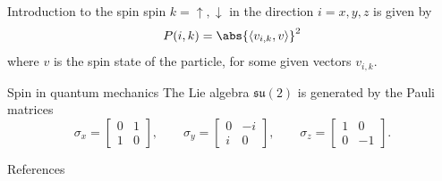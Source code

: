 \documentclass[9pt]{beamer}
\renewcommand{\emph}{\alert}
\begin{document}
{\begin{frame}{Introduction to the spin}
spin $k=\uparrow,\downarrow$ in the direction $i=x,y,z$ is given by
    \begin{equation}
        P(i,k) = \abs{\langle v_{i,k},v \rangle}^2
    \end{equation}
    where $v$ is the spin state of the particle, for some given vectors $v_{i,k}$.

\end{frame}

\begin{frame}{Spin in quantum mechanics}
    The Lie algebra $\mathfrak{su}(2)$ is generated by the \emph{Pauli matrices}
    \begin{equation}
        \sigma_x =
        \begin{bmatrix}
            0 & 1\\
            1 & 0
        \end{bmatrix},\qquad
        \sigma_y =
        \begin{bmatrix}
            0 & -i\\
            i & 0
        \end{bmatrix},\qquad
        \sigma_z =
        \begin{bmatrix}
            1 & 0\\
            0 & -1
        \end{bmatrix}.
    \end{equation}
    
\end{frame}

}

\begin{frame}[allowframebreaks]{References}




\end{frame}
\end{document}
